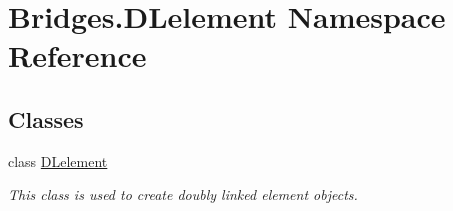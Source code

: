 \hypertarget{namespace_bridges_1_1_d_lelement}{}\section{Bridges.\+D\+Lelement Namespace Reference}
\label{namespace_bridges_1_1_d_lelement}
\subsection*{Classes}
\begin{DoxyCompactItemize}
\item 
class \hyperlink{class_bridges_1_1_d_lelement_1_1_d_lelement}{D\+Lelement}
\begin{DoxyCompactList}\small\item\em This class is used to create doubly linked element objects. \end{DoxyCompactList}\end{DoxyCompactItemize}
